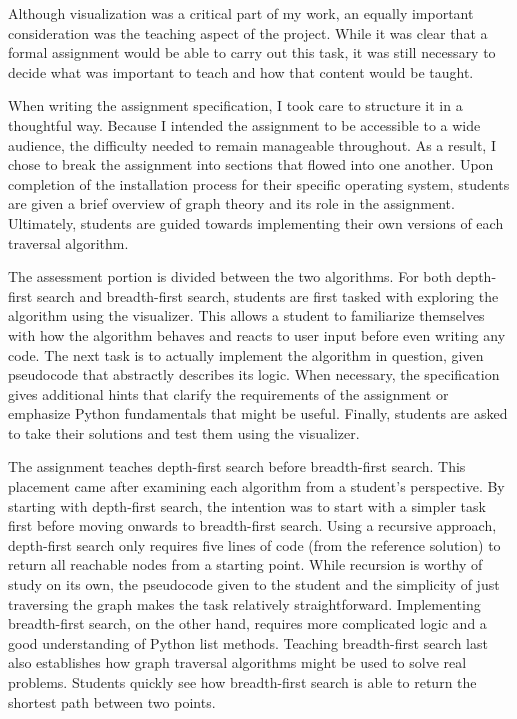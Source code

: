 \documentclass[pageno]{jpaper}
\begin{document}
Although visualization was a critical part of my work, an equally important consideration was the teaching aspect of the project. While it was clear that a formal assignment would be able to carry out this task, it was still necessary to decide what was important to teach and how that content would be taught.

When writing the assignment specification, I took care to structure it in a thoughtful way. Because I intended the assignment to be accessible to a wide audience, the difficulty needed to remain manageable throughout. As a result, I chose to break the assignment into sections that flowed into one another. Upon completion of the installation process for their specific operating system, students are given a brief overview of graph theory and its role in the assignment. Ultimately, students are guided towards implementing their own versions of each traversal algorithm.

The assessment portion is divided between the two algorithms. For both depth-first search and breadth-first search, students are first tasked with exploring the algorithm using the visualizer. This allows a student to familiarize themselves with how the algorithm behaves and reacts to user input before even writing any code. The next task is to actually implement the algorithm in question, given pseudocode that abstractly describes its logic. When necessary, the specification gives additional hints that clarify the requirements of the assignment or emphasize Python fundamentals that might be useful. Finally, students are asked to take their solutions and test them using the visualizer.

The assignment teaches depth-first search before breadth-first search. This placement came after examining each algorithm from a student's perspective. By starting with depth-first search, the intention was to start with a simpler task first before moving onwards to breadth-first search. Using a recursive approach, depth-first search only requires five lines of code (from the reference solution) to return all reachable nodes from a starting point. While recursion is worthy of study on its own, the pseudocode given to the student and the simplicity of just traversing the graph makes the task relatively straightforward. Implementing breadth-first search, on the other hand, requires more complicated logic and a good understanding of Python list methods. Teaching breadth-first search last also establishes how graph traversal algorithms might be used to solve real problems. Students quickly see how breadth-first search is able to return the shortest path between two points.
\end{document}
